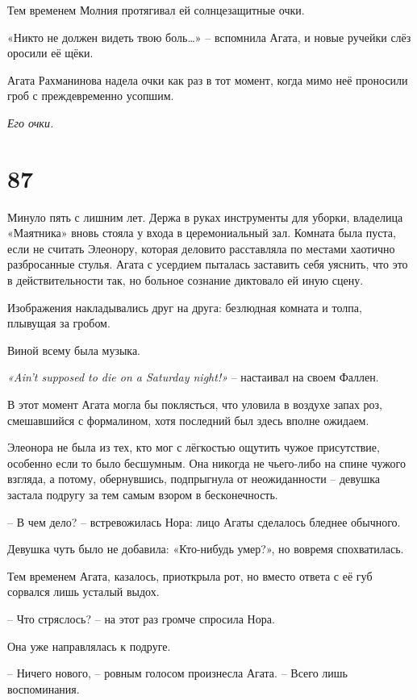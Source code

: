 \documentclass[
  a5paperpaper,
  DIV=11,
  numbers=noendperiod]{scrreprt}
\begin{document}
Тем временем Молния протягивал ей солнцезащитные очки.

«Никто не должен видеть твою боль\ldots» -- вспомнила Агата, и новые
ручейки слёз оросили её щёки.

Агата Рахманинова надела очки как раз в тот момент, когда мимо неё
проносили гроб с преждевременно усопшим.

\emph{Его очки.}

\section*{87}\label{87}


Минуло пять с лишним лет. Держа в руках инструменты для уборки,
владелица «Маятника» вновь стояла у входа в церемониальный зал. Комната
была пуста, если не считать Элеонору, которая деловито расставляла по
местами хаотично разбросанные стулья. Агата с усердием пыталась
заставить себя уяснить, что это в действительности так, но больное
сознание диктовало ей иную сцену.

Изображения накладывались друг на друга: безлюдная комната и толпа,
плывущая за гробом.

Виной всему была музыка.

\emph{«Ain't supposed to die on a Saturday night!»} -- настаивал на
своем Фаллен.

В этот момент Агата могла бы поклясться, что уловила в воздухе запах
роз, смешавшийся с формалином, хотя последний был здесь вполне ожидаем.

Элеонора не была из тех, кто мог с лёгкостью ощутить чужое присутствие,
особенно если то было бесшумным. Она никогда не чьего-либо на спине
чужого взгляда, а потому, обернувшись, подпрыгнула от неожиданности --
девушка застала подругу за тем самым взором в бесконечность.

-- В чем дело? -- встревожилась Нора: лицо Агаты сделалось бледнее
обычного.

Девушка чуть было не добавила: «Кто-нибудь умер?», но вовремя
спохватилась.

Тем временем Агата, казалось, приоткрыла рот, но вместо ответа с её губ
сорвался лишь усталый выдох.

-- Что стряслось? -- на этот раз громче спросила Нора.

Она уже направлялась к подруге.

-- Ничего нового, -- ровным голосом произнесла Агата. -- Всего лишь
воспоминания.
\end{document}

